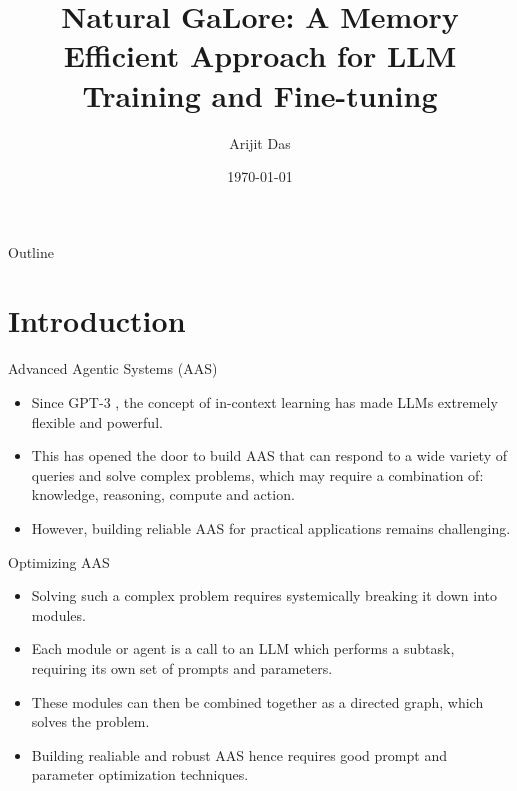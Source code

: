 \documentclass{beamer}
\title[Natural GaLore]{Natural GaLore: A Memory Efficient Approach for LLM Training and Fine-tuning}
\author{Arijit Das}
\date{\today}
\begin{document}
\begin{frame}
    \titlepage
\end{frame}

\begin{frame}{Outline}
    \tableofcontents
\end{frame}

\section{Introduction}

\begin{frame}{Advanced Agentic Systems (AAS)}
    \begin{itemize}
        \item Since GPT-3 \citep{brownLanguageModelsAre2020}, the concept of in-context learning has made LLMs extremely flexible and powerful.
        \item This has opened the door to build AAS that can respond to a wide variety of queries and solve complex problems, which may require a combination of: knowledge, reasoning, compute and action.
        \item However, building reliable AAS for practical applications remains challenging.
    \end{itemize}
\end{frame}

\begin{frame}{Optimizing AAS}
    \begin{itemize}
        \item Solving such a complex problem requires systemically breaking it down into modules.
        \item Each module or agent is a call to an LLM which performs a subtask, requiring its own set of prompts and parameters.
        \item These modules can then be combined together as a directed graph, which solves the problem.
        \item Building realiable and robust AAS hence requires good prompt and parameter optimization techniques.
    \end{itemize}
\end{frame}
\end{document}
